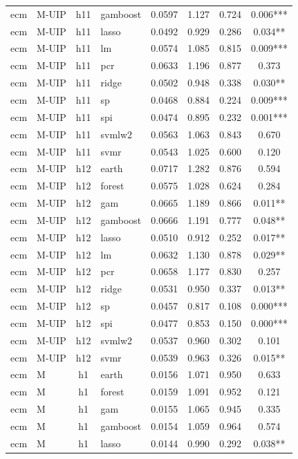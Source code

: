 \begin{ThreePartTable}
\begin{longtable}[t]{llclcccc}
ecm & M-UIP & h11 & gamboost & 0.0597 & 1.127 & 0.724 & 0.006***\\
ecm & M-UIP & h11 & lasso & 0.0492 & 0.929 & 0.286 & 0.034**\\
ecm & M-UIP & h11 & lm & 0.0574 & 1.085 & 0.815 & 0.009***\\
ecm & M-UIP & h11 & pcr & 0.0633 & 1.196 & 0.877 & 0.373\\
ecm & M-UIP & h11 & ridge & 0.0502 & 0.948 & 0.338 & 0.030**\\
ecm & M-UIP & h11 & sp & 0.0468 & 0.884 & 0.224 & 0.009***\\
ecm & M-UIP & h11 & spi & 0.0474 & 0.895 & 0.232 & 0.001***\\
ecm & M-UIP & h11 & svmlw2 & 0.0563 & 1.063 & 0.843 & 0.670\\
ecm & M-UIP & h11 & svmr & 0.0543 & 1.025 & 0.600 & 0.120\\
\addlinespace
ecm & M-UIP & h12 & earth & 0.0717 & 1.282 & 0.876 & 0.594\\
ecm & M-UIP & h12 & forest & 0.0575 & 1.028 & 0.624 & 0.284\\
ecm & M-UIP & h12 & gam & 0.0665 & 1.189 & 0.866 & 0.011**\\
ecm & M-UIP & h12 & gamboost & 0.0666 & 1.191 & 0.777 & 0.048**\\
ecm & M-UIP & h12 & lasso & 0.0510 & 0.912 & 0.252 & 0.017**\\
ecm & M-UIP & h12 & lm & 0.0632 & 1.130 & 0.878 & 0.029**\\
ecm & M-UIP & h12 & pcr & 0.0658 & 1.177 & 0.830 & 0.257\\
ecm & M-UIP & h12 & ridge & 0.0531 & 0.950 & 0.337 & 0.013**\\
ecm & M-UIP & h12 & sp & 0.0457 & 0.817 & 0.108 & 0.000***\\
ecm & M-UIP & h12 & spi & 0.0477 & 0.853 & 0.150 & 0.000***\\
ecm & M-UIP & h12 & svmlw2 & 0.0537 & 0.960 & 0.302 & 0.101\\
ecm & M-UIP & h12 & svmr & 0.0539 & 0.963 & 0.326 & 0.015**\\
\addlinespace
ecm & M & h1 & earth & 0.0156 & 1.071 & 0.950 & 0.633\\
ecm & M & h1 & forest & 0.0159 & 1.091 & 0.952 & 0.121\\
ecm & M & h1 & gam & 0.0155 & 1.065 & 0.945 & 0.335\\
ecm & M & h1 & gamboost & 0.0154 & 1.059 & 0.964 & 0.574\\
ecm & M & h1 & lasso & 0.0144 & 0.990 & 0.292 & 0.038**\\

\end{longtable}
\end{ThreePartTable}
